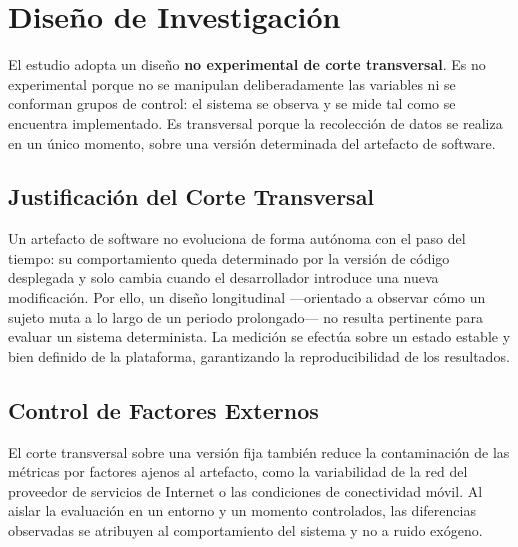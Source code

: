 \section{Dise\~no de Investigaci\'on}

El estudio adopta un dise\~no \textbf{no experimental de corte transversal}. Es no
experimental porque no se manipulan deliberadamente las variables ni se conforman
grupos de control: el sistema se observa y se mide tal como se encuentra
implementado. Es transversal porque la recolecci\'on de datos se realiza en un
\'unico momento, sobre una versi\'on determinada del artefacto de software.

\subsection{Justificaci\'on del Corte Transversal}

Un artefacto de software no evoluciona de forma aut\'onoma con el paso del tiempo:
su comportamiento queda determinado por la versi\'on de c\'odigo desplegada y solo
cambia cuando el desarrollador introduce una nueva modificaci\'on. Por ello, un
dise\~no longitudinal ---orientado a observar c\'omo un sujeto muta a lo largo de un
periodo prolongado--- no resulta pertinente para evaluar un sistema determinista.
La medici\'on se efect\'ua sobre un estado estable y bien definido de la
plataforma, garantizando la reproducibilidad de los resultados.

\subsection{Control de Factores Externos}

El corte transversal sobre una versi\'on fija tambi\'en reduce la contaminaci\'on de
las m\'etricas por factores ajenos al artefacto, como la variabilidad de la red del
proveedor de servicios de Internet o las condiciones de conectividad m\'ovil. Al
aislar la evaluaci\'on en un entorno y un momento controlados, las diferencias
observadas se atribuyen al comportamiento del sistema y no a ruido ex\'ogeno.
